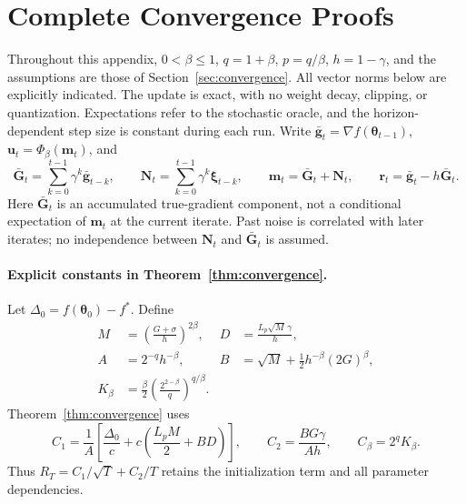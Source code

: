 \documentclass[10pt,a4paper]{amsart}
\begin{document}
\section{Complete Convergence Proofs}
\label{app:proofs}
Throughout this appendix, $0<\beta\le1$, $q=1+\beta$, $p=q/\beta$, $h=1-\gamma$, and the assumptions are those of Section~\ref{sec:convergence}. All vector norms below are explicitly indicated. The update is exact, with no weight decay, clipping, or quantization. Expectations refer to the stochastic oracle, and the horizon-dependent step size is constant during each run. Write $\bar{\mathbf{g}}_t=\nabla f(\bm{\theta}_{t-1})$, $\mathbf{u}_t=\Phi_\beta(\mathbf{m}_t)$, and
\begin{equation}\label{eq:buffer-decomp}
\bar{\mathbf{G}}_t=\sum_{k=0}^{t-1}\gamma^k\bar{\mathbf{g}}_{t-k},\qquad
\mathbf{N}_t=\sum_{k=0}^{t-1}\gamma^k\bm{\xi}_{t-k},\qquad
\mathbf{m}_t=\bar{\mathbf{G}}_t+\mathbf{N}_t,\qquad \mathbf{r}_t=\bar{\mathbf{g}}_t-h\bar{\mathbf{G}}_t.
\end{equation}
Here $\bar{\mathbf{G}}_t$ is an accumulated true-gradient component, not a conditional expectation of $\mathbf{m}_t$ at the current iterate. Past noise is correlated with later iterates; no independence between $\mathbf{N}_t$ and $\bar{\mathbf{G}}_t$ is assumed.

\paragraph{Explicit constants in Theorem~\ref{thm:convergence}.}
Let $\Delta_0=f(\bm{\theta}_0)-f^*$. Define
\begin{align}
M&=\left(\frac{G+\sigma}{h}\right)^{2\beta},
&D&=\frac{L_p\sqrt M\,\gamma}{h},\nonumber\\
A&=2^{-q}h^{-\beta},
&B&=\sqrt M+\tfrac12h^{-\beta}(2G)^\beta,\label{eq:theory-constants}\\
K_\beta&=\frac{\beta}{2}\left(\frac{2^{2-\beta}}q\right)^{q/\beta}.\nonumber
\end{align}
Theorem~\ref{thm:convergence} uses
\begin{equation}
C_1=\frac1A\left[\frac{\Delta_0}{c}+c\left(\frac{L_pM}{2}+BD\right)\right],\qquad
C_2=\frac{BG\gamma}{Ah},\qquad C_\beta=2^qK_\beta.
\end{equation}
Thus $R_T=C_1/\sqrt T+C_2/T$ retains the initialization term and all parameter dependencies.
\end{document}
